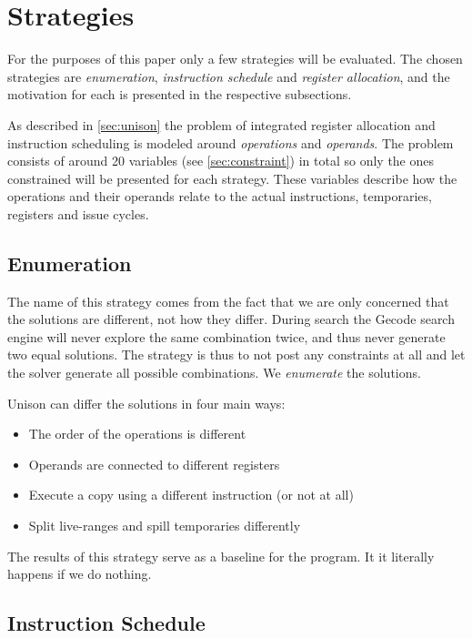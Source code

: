 \section{Strategies}
\label{sec:strategies}

For the purposes of this paper only a few strategies will be evaluated. The chosen
strategies are \textit{enumeration}, \textit{instruction schedule} and
\textit{register allocation}, and the motivation for each is presented in the respective
subsections.

As described in \ref{sec:unison} the problem of integrated register allocation and
instruction scheduling is modeled around \textit{operations} and \textit{operands}. The
problem consists of around 20 variables (see \ref{sec:constraint}) in total so only the
ones constrained will be presented for each strategy. These variables describe how the
operations and their operands relate to the actual instructions, temporaries, registers
and issue cycles.

\subsection{Enumeration}

The name of this strategy comes from the fact that we are only concerned that the solutions
are different, not how they differ. During search the Gecode search engine will never
explore the same combination twice, and thus never generate two equal solutions. The
strategy is thus to not post any constraints at all and let the solver generate all
possible combinations. We \textit{enumerate} the solutions.

Unison can differ the solutions in four main ways:

\begin{itemize}
	\item The order of the operations is different
	\item Operands are connected to different registers
	\item Execute a copy using a different instruction (or not at all)
	\item Split live-ranges and spill temporaries differently
\end{itemize}

The results of this strategy serve as a baseline for the program. It it literally happens
if we do nothing.

\subsection{Instruction Schedule}

